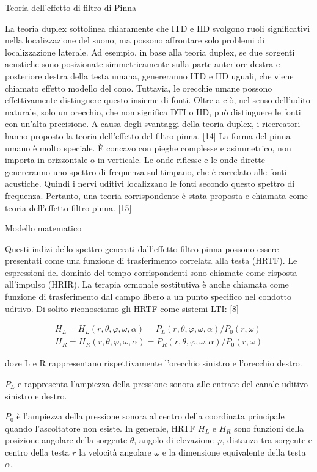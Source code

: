 Teoria dell'effetto di filtro di Pinna

La teoria duplex sottolinea chiaramente che ITD e IID svolgono ruoli significativi
nella localizzazione del suono, ma possono affrontare solo problemi di localizzazione
laterale. Ad esempio, in base alla teoria duplex, se due sorgenti acustiche sono
posizionate simmetricamente sulla parte anteriore destra e posteriore destra della
testa umana, genereranno ITD e IID uguali, che viene chiamato effetto modello del
cono. Tuttavia, le orecchie umane possono effettivamente distinguere questo insieme
di fonti. Oltre a ciò, nel senso dell'udito naturale, solo un orecchio, che non
significa DTI o IID, può distinguere le fonti con un'alta precisione. A causa
degli svantaggi della teoria duplex, i ricercatori hanno proposto la teoria
dell'effetto del filtro pinna. [14] La forma del pinna umano è molto speciale.
È concavo con pieghe complesse e asimmetrico, non importa in orizzontale o in
verticale. Le onde riflesse e le onde dirette genereranno uno spettro di frequenza
sul timpano, che è correlato alle fonti acustiche. Quindi i nervi uditivi
localizzano le fonti secondo questo spettro di frequenza. Pertanto, una teoria
corrispondente è stata proposta e chiamata come teoria dell'effetto filtro pinna. [15]

Modello matematico

Questi indizi dello spettro generati dall'effetto filtro pinna possono essere
presentati come una funzione di trasferimento correlata alla testa (HRTF).
Le espressioni del dominio del tempo corrispondenti sono chiamate come risposta
all'impulso (HRIR). La terapia ormonale sostitutiva è anche chiamata come
funzione di trasferimento dal campo libero a un punto specifico nel condotto
uditivo. Di solito riconosciamo gli HRTF come sistemi LTI: [8]

\begin{gather*}
H_{L} = H_{L}(r,\theta,\varphi,\omega,\alpha) = P_{L}(r,\theta,\varphi,\omega,\alpha)/P_{0}(r,\omega) \\
H_{R} = H_{R}(r,\theta,\varphi,\omega,\alpha) = P_{R}(r,\theta,\varphi,\omega,\alpha)/P_{0}(r,\omega)
\end{gather*}

dove L e R rappresentano rispettivamente l'orecchio sinistro e l'orecchio destro.

$P_{L}$ e rappresenta l'ampiezza della pressione sonora alle entrate del canale
uditivo sinistro e destro.

$P_{0}$ è l'ampiezza della pressione sonora al centro della coordinata principale
quando l'ascoltatore non esiste. In generale, HRTF $H_{L}$ e $H_{R}$ sono funzioni
della posizione angolare della sorgente $\theta$, angolo di elevazione $\varphi$,
distanza tra sorgente e centro della testa $r$ la velocità angolare $\omega$
e la dimensione equivalente della testa $\alpha$.

